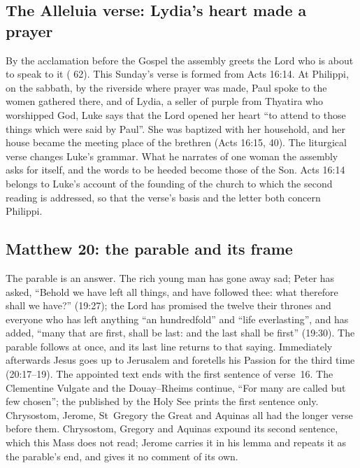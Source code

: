 \subsection{The Alleluia verse: Lydia's heart made a prayer}

By the acclamation before the Gospel the assembly greets the Lord who is about
to speak to it ( 62). This
Sunday's verse is formed from Acts 16:14. At Philippi, on the sabbath, by the
riverside where prayer was made, Paul spoke to the women gathered there, and
of Lydia, a seller of purple from Thyatira who worshipped God, Luke says that
the Lord opened her heart ``to attend to those things which were said by
Paul''. She was baptized with her household, and her house became the meeting
place of the brethren (Acts 16:15, 40). The liturgical verse changes Luke's
grammar. What he narrates of one woman the assembly asks for itself, and the
words to be heeded become those of the Son. Acts 16:14 belongs to Luke's
account of the founding of the church to which the second reading is
addressed, so that the verse's basis and the letter both concern Philippi.

\subsection{Matthew 20: the parable and its frame}

The parable is an answer. The rich young man has gone away sad; Peter has
asked, ``Behold we have left all things, and have followed thee: what
therefore shall we have?'' (19:27); the Lord has promised the twelve their
thrones and everyone who has left anything ``an hundredfold'' and ``life
everlasting'', and has added, ``many that are first, shall be last: and the
last shall be first'' (19:30). The parable follows at once, and its last line
returns to that saying. Immediately afterwards Jesus goes up to Jerusalem and
foretells his Passion for the third time (20:17--19). The appointed text ends
with the first sentence of verse~16. The Clementine Vulgate and the
Douay--Rheims continue, ``For many are called but few chosen''; the
 published by the Holy See prints the first sentence only.
Chrysostom, Jerome, St~Gregory the Great and Aquinas all had the longer verse
before them. Chrysostom, Gregory and Aquinas expound its second sentence, which
this Mass does not read; Jerome carries it in his lemma and repeats it as the
parable's end, and gives it no comment of its own.

